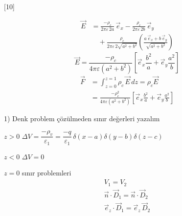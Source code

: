 \documentclass[11pt,a4paper]{article}
\begin{document}
[10]


\begin{align*}
\vec E&=\frac{-\rho_c}{2\pi\varepsilon\,2a}\,\vec e_x-\frac{\rho_c}{2\pi\varepsilon\,2b}\,\vec e_y\\
&\quad+\frac{\rho_c}{2\pi\varepsilon\,2\sqrt{a^{2}+b^{2}}}\left(\frac{a\,\vec e_x+b\,\vec e_y}{\sqrt{a^{2}+b^{2}}}\right)
\end{align*}
\[
\vec E=\frac{-\rho_c}{4\pi\varepsilon(a^{2}+b^{2})}\left[\vec e_x\frac{b^{2}}{a}+\vec e_y\frac{a^{2}}{b}\right]
\]
\begin{align*}
\vec F&=\int_{z=0}^{z=1}\rho_c\,\vec E\,dz=\rho_c\vec E\\
&=\frac{-\rho_c^{2}}{4\pi\varepsilon(a^{2}+b^{2})}\left[\vec e_x\frac{b^{2}}{a}+\vec e_y\frac{a^{2}}{b}\right]
\end{align*}


1) Denk problem çözülmeden sınır değerleri yazalım

$z>0$ \quad $\Delta V=\dfrac{-\rho_v}{\varepsilon_1}=\dfrac{-q}{\varepsilon_1}\,\delta(x-a)\delta(y-b)\delta(z-c)$

$z<0$ \quad $\Delta V=0$

$z=0$ sınır problemleri
\begin{gather*}
V_1=V_2\\
\vec n\cdot\vec D_1=\vec n\cdot\vec D_2\\
\vec e_z\cdot\vec D_1=\vec e_z\,\vec D_2
\end{gather*}
\end{document}
